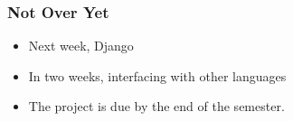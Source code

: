 \begin{frame}[fragile]
\frametitle{Not Over Yet}
\begin{itemize}
\item Next week, \alert{Django}
\item In two weeks, \alert{interfacing with other languages}
\item The project is due by the end of the semester.
\end{itemize}
\end{frame}


